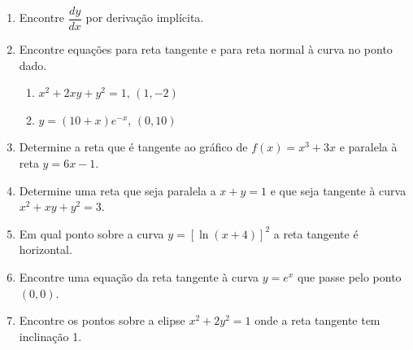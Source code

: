 \begin{enumerate}
    \item Encontre $\dfrac{dy}{dx}$ por derivação implícita.
        \begin{enumerate}
        \end{enumerate}
    \item Encontre equações para reta tangente e para reta normal à curva no ponto dado.
        \begin{enumerate}
            \item $x^2+2xy + y^2=1$, \quad $(1,-2)$
            \item $y=(10 +x)e^{-x}$, \quad $(0,10)$
        \end{enumerate}
        
    \item Determine a reta que é tangente ao gráfico de $f(x)=x^3+3x$ e  paralela à reta $y=6x-1$.
    
    \item Determine uma reta que seja paralela a $x+y=1$ e que seja tangente à curva $x^2+xy+y^2=3$.
    \item Em qual ponto sobre a curva $y=\left[\ln(x+4)\right]^2$ a reta tangente é horizontal.
    
    \item Encontre uma equação da reta tangente à curva $y=e^x$ que passe pelo ponto $(0,0)$.
    \item Encontre os pontos sobre a elipse $x^2+2y^2=1$ onde a reta tangente tem inclinação 1.
\end{enumerate}